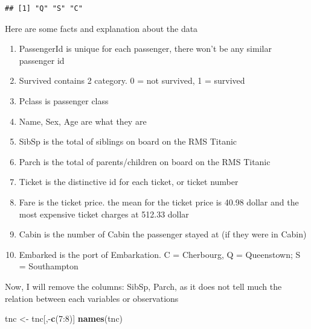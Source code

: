 \documentclass[
]{article}
\newenvironment{Shaded}{\begin{snugshade}}{\end{snugshade}}
\newcommand{\DecValTok}[1]{\textcolor[rgb]{0.27,0.67,0.26}{#1}}
\newcommand{\FunctionTok}[1]{\textcolor[rgb]{1.00,0.58,0.35}{\textbf{#1}}}
\newcommand{\NormalTok}[1]{\textcolor[rgb]{0.74,0.68,0.62}{#1}}
\newcommand{\OtherTok}[1]{\textcolor[rgb]{0.74,0.68,0.62}{#1}}
\newcommand{\SpecialCharTok}[1]{\textcolor[rgb]{0.02,0.61,0.04}{#1}}
\begin{document}
\begin{Shaded}
\end{Shaded}

\begin{verbatim}
## [1] "Q" "S" "C"
\end{verbatim}

Here are some facts and explanation about the data

\begin{enumerate}
\def\labelenumi{\arabic{enumi}.}
\item
  PassengerId is unique for each passenger, there won't be any similar
  passenger id
\item
  Survived contains 2 category. 0 = not survived, 1 = survived
\item
  Pclass is passenger class
\item
  Name, Sex, Age are what they are
\item
  SibSp is the total of siblings on board on the RMS Titanic
\item
  Parch is the total of parents/children on board on the RMS Titanic
\item
  Ticket is the distinctive id for each ticket, or ticket number
\item
  Fare is the ticket price. the mean for the ticket price is 40.98
  dollar and the most expensive ticket charges at 512.33 dollar
\item
  Cabin is the number of Cabin the passenger stayed at (if they were in
  Cabin)
\item
  Embarked is the port of Embarkation. C = Cherbourg, Q = Queenstown; S
  = Southampton
\end{enumerate}

Now, I will remove the columns: SibSp, Parch, as it does not tell much
the relation between each variables or observations

\begin{Shaded}
\begin{Highlighting}[]
\NormalTok{tnc }\OtherTok{\textless{}{-}}\NormalTok{ tnc[,}\SpecialCharTok{{-}}\FunctionTok{c}\NormalTok{(}\DecValTok{7}\SpecialCharTok{:}\DecValTok{8}\NormalTok{)]}
\FunctionTok{names}\NormalTok{(tnc)}
\end{Highlighting}
\end{Shaded}
\end{document}
